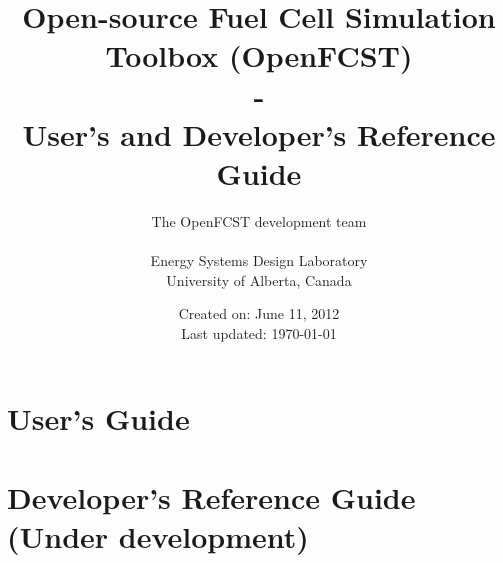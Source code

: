 \documentclass[]{book}
\title{{\Huge Open-source Fuel Cell Simulation Toolbox (OpenFCST)} \\
       { - \\}
       {\huge User's and Developer's Reference Guide}}
\author{The OpenFCST development team \\
                 \\
        Energy Systems Design Laboratory\\
        University of Alberta, Canada}
\date{Created on: June 11, 2012 \\
      Last updated: \today}
\begin{document}
\maketitle

\tableofcontents



\part{User's Guide}





% 


\part{Developer's Reference Guide (Under development)}



%
%


%
\end{document}

